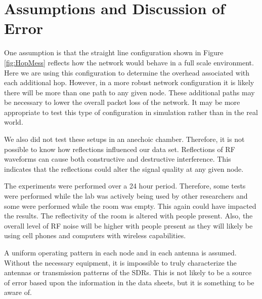 
\section{Assumptions and Discussion of Error}

One assumption is that the straight line configuration shown in Figure \ref{fig:HopMess} reflects how the network would behave in a full scale environment. Here we are using this configuration to determine the overhead associated with each additional hop. However, in a more robust network configuration it is likely there will be more than one path to any given node. These additional paths may be necessary to lower the overall packet loss of the network. It may be more appropriate to test this type of configuration in simulation rather than in the real world. 

We also did not test these setups in an anechoic chamber. Therefore, it is not possible to know how reflections influenced our data set. Reflections of RF waveforms can cause both constructive and destructive interference. This indicates that the reflections could alter the signal quality at any given node.  

The experiments were performed over a 24 hour period. Therefore, some tests were performed while the lab was actively being used by other researchers and some were performed while the room was empty. This again could have impacted the results. The reflectivity of the room is altered with people present. Also, the overall level of RF noise will be higher with people present as they will likely be using cell phones and computers with wireless capabilities. 

A uniform operating pattern in each node and in each antenna is assumed. Without the necessary equipment, it is impossible to truly characterize the antennas or transmission patterns of the SDRs. This is not likely to be a source of error based upon the information in the data sheets, but it is something to be aware of. 





